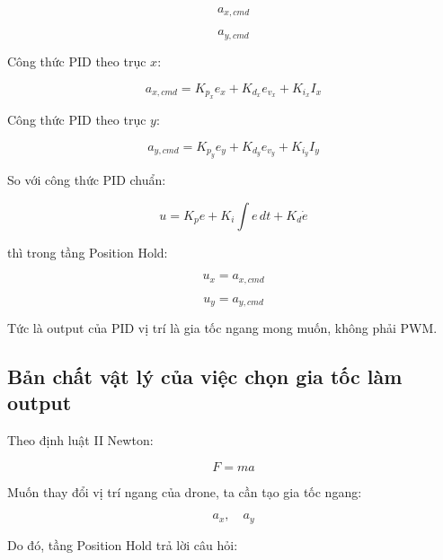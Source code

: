\begin{equation}
    a_{x,cmd}
\end{equation}

\begin{equation}
    a_{y,cmd}
\end{equation}

Công thức PID theo trục $x$:

\begin{equation}
    a_{x,cmd}
    =
    K_{p_x} e_x
    +
    K_{d_x} e_{v_x}
    +
    K_{i_x} I_x
\end{equation}

Công thức PID theo trục $y$:

\begin{equation}
    a_{y,cmd}
    =
    K_{p_y} e_y
    +
    K_{d_y} e_{v_y}
    +
    K_{i_y} I_y
\end{equation}

So với công thức PID chuẩn:

\begin{equation}
    u = K_p e + K_i \int e\,dt + K_d \dot{e}
\end{equation}

thì trong tầng Position Hold:

\begin{equation}
    u_x = a_{x,cmd}
\end{equation}

\begin{equation}
    u_y = a_{y,cmd}
\end{equation}

Tức là output của PID vị trí là gia tốc ngang mong muốn, không phải PWM.

\subsection{Bản chất vật lý của việc chọn gia tốc làm output}

Theo định luật II Newton:

\begin{equation}
    F = ma
\end{equation}

Muốn thay đổi vị trí ngang của drone, ta cần tạo gia tốc ngang:

\begin{equation}
    a_x,\quad a_y
\end{equation}

Do đó, tầng Position Hold trả lời câu hỏi:

